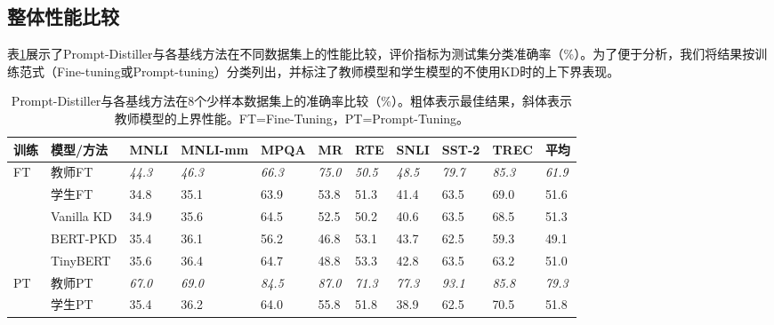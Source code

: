 \documentclass[../main.tex]{subfiles}
\begin{document}
\subsection{整体性能比较}
\label{sec:3-5-2}
表\ref{tab:overall-results}展示了Prompt-Distiller与各基线方法在不同数据集上的性能比较，评价指标为测试集分类准确率（\%）。为了便于分析，我们将结果按训练范式（Fine-tuning或Prompt-tuning）分类列出，并标注了教师模型和学生模型的不使用KD时的上下界表现。

\begin{table}[htbp]
	\centering
	\caption{Prompt-Distiller与各基线方法在8个少样本数据集上的准确率比较（\%）。粗体表示最佳结果，斜体表示教师模型的上界性能。FT=Fine-Tuning，PT=Prompt-Tuning。}
	\label{tab:overall-results}
	\footnotesize\begin{tabularx}{1\textwidth}{X|l|*{8}{X}|X}
		\toprule[1pt]
		\textbf{训练} & \textbf{模型/方法}            & MNLI          & MNLI-mm       & MPQA          & MR            & RTE           & SNLI          & SST-2         & TREC          & 平均            \\
		\midrule[0.5pt]
		\multirow{5}{*}{FT}
		            & 教师FT                      & \textit{44.3} & \textit{46.3} & \textit{66.3} & \textit{75.0} & \textit{50.5} & \textit{48.5} & \textit{79.7} & \textit{85.3} & \textit{61.9} \\
		            & 学生FT                      & 34.8          & 35.1          & 63.9          & 53.8          & 51.3          & 41.4          & 63.5          & 69.0          & 51.6          \\
		\cline{2-11}
		            & Vanilla KD                & 34.9          & 35.6          & 64.5          & 52.5          & 50.2          & 40.6          & 63.5          & 68.5          & 51.3          \\
		            & BERT-PKD                  & 35.4          & 36.1          & 56.2          & 46.8          & 53.1          & 43.7          & 62.5          & 59.3          & 49.1          \\
		            & TinyBERT                  & 35.6          & 36.4          & 64.7          & 48.8          & 53.3          & 42.8          & 63.5          & 63.2          & 51.0          \\
		\midrule[0.5pt]
		\multirow{4}{*}{PT}
		            & 教师PT                      & \textit{67.0} & \textit{69.0} & \textit{84.5} & \textit{87.0} & \textit{71.3} & \textit{77.3} & \textit{93.1} & \textit{85.8} & \textit{79.3} \\
		            & 学生PT                      & 35.4          & 36.2          & 64.0          & 55.8          & 51.8          & 38.9          & 62.5          & 70.5          & 51.8          \\

\end{tabularx}
\end{table}
\end{document}
